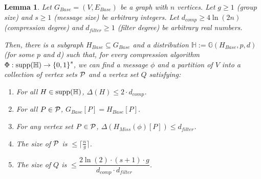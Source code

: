 \documentclass[11pt]{article}
\newtheorem{lemma}{Lemma}[section]
\theoremstyle{definition}
\renewcommand{\leq}{\leqslant}
\renewcommand{\geq}{\geqslant}
\renewcommand{\le}{\leq}
\renewcommand{\ge}{\geq}
\newcommand{\supp}[1]{\ensuremath{\textnormal{\text{supp}}(#1)}}
\begin{document}
\begin{lemma}\label{compressed-partition}
Let $G_{Base}=(V, E_{Base})$ be a graph with $n$ vertices. Let $g\ge 1$ (group size) and $s\ge 1$ (message size) be arbitrary integers. Let $d_{comp}\ge4\ln(2n)$ (compression degree) and $d_{filter}\ge 1$ (filter degree) be arbitrary real numbers.

Then, there is a subgraph $H_{Base}\subseteq G_{Base}$ and a distribution $\mathbb{H}:=\mathbb{G}(H_{Base}, p, d)$ (for some $p$ and $d$) such that, for every compression algorithm $\Phi:\supp{\mathbb{H}}\rightarrow {\{0, 1 \}}^s$, we can find a message $\phi$ and a partition of $V$ into a collection of vertex sets $\mathcal{P}$ and a vertex set $Q$ satisfying:
\begin{enumerate}
    \item\label{H-degree} For all $H\in \supp{\mathbb{H}}$, $\Delta{(H)}\le 2\cdot d_{comp}$.
    \item\label{edge-in} For all $P\in \mathcal{P}$, $G_{Base}[P]=H_{Base}[P]$.
    \item\label{P-condition} For any vertex set $P\in \mathcal{P}$, $\Delta{(H_{Miss}(\phi)[P])}\le d_{filter}$. 
    \item\label{P-size} The size of $\mathcal{P}$ is $\le\lceil\frac ng\rceil$. 
    \item\label{Q-condition} The size of $Q$ is $\le \dfrac{2\ln (2)\cdot (s+1)\cdot g}{d_{comp}\cdot d_{filter}}$.
\end{enumerate}
\end{lemma}
\end{document}

